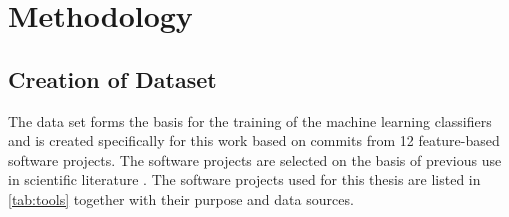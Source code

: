 
\section{Methodology}

\subsection{Creation of Dataset}

The data set forms the basis for the training of the machine learning classifiers and is created specifically for this work based on commits from 12 feature-based software projects. The software projects are selected on the basis of previous use in scientific literature \cite{Hunsen2015,Liebig2010,Queiroz2015,Queiroz2016}. The software projects used for this thesis are listed in \autoref{tab:tools} together with their purpose and data sources.

\begin{table}[ht]
\centering
\caption{Used software projects}
\label{tab:tools}
\end{table}

